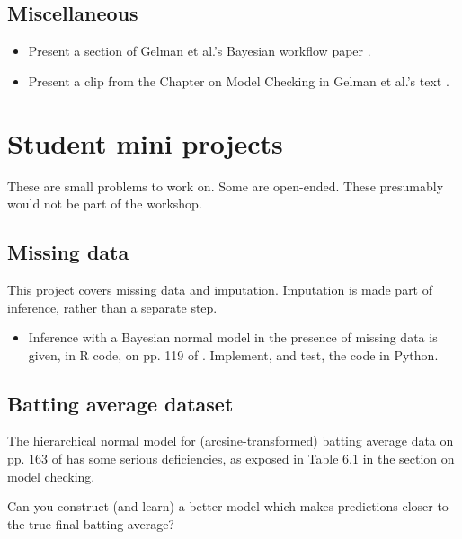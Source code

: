 \documentclass{article} %
\begin{document}
\subsection{Miscellaneous} 
\begin{itemize}
\item Present a section of Gelman et al.'s Bayesian workflow paper \cite{gelman2020bayesian}. 
\item Present a clip from the Chapter on Model Checking in Gelman et al.'s text \cite{gelman2013bayesian}.
\end{itemize}



{}




\appendix

\section{Student mini projects}

These are small problems to work on.  Some are open-ended.  These presumably would not be part of the workshop.

\subsection{Missing data}

This project covers missing data and imputation.  Imputation is made part of inference,  rather than a separate step. 

\begin{itemize}
\item  Inference with a Bayesian normal model in the presence of missing data is given,  in R code,  on pp. 119 of \cite{hoff2009first}.    Implement,  and test,  the code in Python.
\end{itemize}

\subsection{Batting average dataset}

The hierarchical normal model for (arcsine-transformed) batting average data on pp.  163 of \cite{gelman2013bayesian} has some serious deficiencies,  as exposed in Table 6.1 in the section on model checking.    

Can you construct (and learn) a better model which makes predictions closer to the true final batting average?
 
\end{document}
